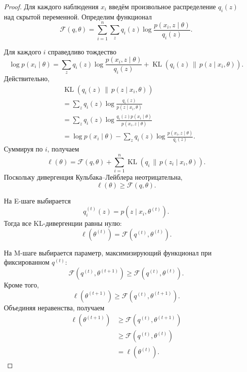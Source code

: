 \documentclass[12pt,a4paper]{article}
\theoremstyle{definition}
\theoremstyle{remark}
\begin{document}
\begin{proof}
Для каждого наблюдения $x_i$ введём произвольное распределение
$q_i(z)$ над скрытой переменной. Определим функционал
\[
    \mathcal{F}(q,\theta)
    =
    \sum_{i=1}^{n}
    \sum_z
    q_i(z)
    \log
    \frac{
        p(x_i,z\mid\theta)
    }{
        q_i(z)
    }.
\]

Для каждого $i$ справедливо тождество
\[
    \log p(x_i\mid\theta)
    =
    \sum_zq_i(z)
    \log
    \frac{
        p(x_i,z\mid\theta)
    }{
        q_i(z)
    }
    +
    \operatorname{KL}
    \left(
        q_i(z)
        \,\|\,
        p(z\mid x_i,\theta)
    \right).
\]
Действительно,
\[
\begin{split}
    &\operatorname{KL}
    \left(
        q_i(z)
        \,\|\,
        p(z\mid x_i,\theta)
    \right)\\
    &=
    \sum_zq_i(z)
    \log
    \frac{
        q_i(z)
    }{
        p(z\mid x_i,\theta)
    }\\
    &=
    \sum_zq_i(z)
    \log
    \frac{
        q_i(z)p(x_i\mid\theta)
    }{
        p(x_i,z\mid\theta)
    }\\
    &=
    \log p(x_i\mid\theta)
    -
    \sum_zq_i(z)
    \log
    \frac{
        p(x_i,z\mid\theta)
    }{
        q_i(z)
    }.
\end{split}
\]
Суммируя по $i$, получаем
\[
    \ell(\theta)
    =
    \mathcal{F}(q,\theta)
    +
    \sum_{i=1}^{n}
    \operatorname{KL}
    \left(
        q_i
        \,\|\,
        p(z_i\mid x_i,\theta)
    \right).
\]
Поскольку дивергенция Кульбака--Лейблера неотрицательна,
\[
    \ell(\theta)\geq\mathcal{F}(q,\theta).
\]

На E-шаге выбирается
\[
    q_i^{(t)}(z)
    =
    p(z\mid x_i,\theta^{(t)}).
\]
Тогда все KL-дивергенции равны нулю:
\[
    \ell(\theta^{(t)})
    =
    \mathcal{F}(q^{(t)},\theta^{(t)}).
\]

На M-шаге выбирается параметр, максимизирующий функционал при фиксированном
$q^{(t)}$:
\[
    \mathcal{F}(q^{(t)},\theta^{(t+1)})
    \geq
    \mathcal{F}(q^{(t)},\theta^{(t)}).
\]
Кроме того,
\[
    \ell(\theta^{(t+1)})
    \geq
    \mathcal{F}(q^{(t)},\theta^{(t+1)}).
\]
Объединяя неравенства, получаем
\[
\begin{split}
    \ell(\theta^{(t+1)})
    &\geq
    \mathcal{F}(q^{(t)},\theta^{(t+1)})\\
    &\geq
    \mathcal{F}(q^{(t)},\theta^{(t)})\\
    &=
    \ell(\theta^{(t)}).
\end{split}
\]
\end{proof}
\end{document}
